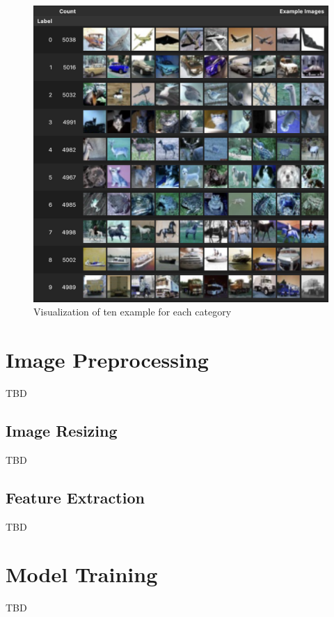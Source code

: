 \documentclass[a4paper,11pt]{article}
\begin{document}
\begin{figure}[H]
    \centering
    \includegraphics[width=\linewidth]{./img/10 examples.png}
    \caption[Label count]{Visualization of ten example for each category}
    \label{fig:example}
\end{figure}

\section{Image Preprocessing}
TBD

\subsection{Image Resizing}
TBD

\subsection{Feature Extraction}
TBD

\section{Model Training}
TBD
\end{document}
